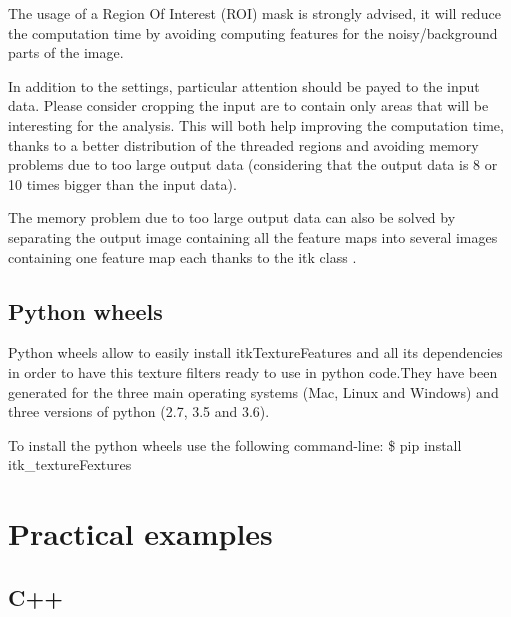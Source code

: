 \documentclass{InsightArticle}
\begin{document}
The usage of a Region Of Interest (ROI) mask is strongly advised, it will reduce the computation time by avoiding computing features for the noisy/background parts of the image.

In addition to the settings, particular attention should be payed to the input data. Please consider cropping the input are to contain only areas that will be interesting for the analysis. This will both help improving the computation time, thanks to a better distribution of the threaded regions and avoiding memory problems due to too large output data (considering that the output data is 8 or 10 times bigger than the input data).

The memory problem due to too large output data can also be solved by separating the output image containing all the feature maps into several images containing one feature map each thanks to the itk class .

\subsection{Python wheels}
\label{sec:PythonWheels}

Python wheels allow to easily install itkTextureFeatures and all its dependencies in order to have this texture filters ready to use in python code.They have been generated for the three main operating systems (Mac, Linux and Windows) and three versions of python (2.7, 3.5 and 3.6).

To install the python wheels use the following command-line: \$ pip install itk\_textureFextures

\newpage
\section{Practical examples}
\label{sec:examples}

\subsection{C++}
\label{sec:C++Ex}
\end{document}

